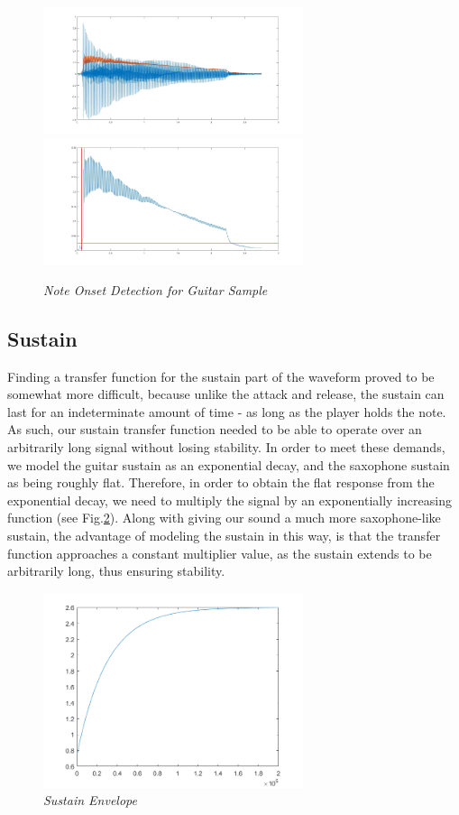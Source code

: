 \documentclass[twoside,a4paper]{article}
\begin{document}
\begin{figure}[ht]
  \includegraphics[width=3in]{Pictures/NoteDetect1.jpg}
  \includegraphics[width=3in]{Pictures/NoteDetect2.jpg}
  \caption{\label{Onset} {\it Note Onset Detection for Guitar Sample}}
  \centering
  \end{figure}

\subsection{Sustain}
Finding a transfer function for the sustain part of the waveform proved
to be somewhat more difficult, because unlike the attack and release,
the sustain can last for an indeterminate amount of time - as long as
the player holds the note. As such, our sustain transfer function needed
to be able to operate over an arbitrarily long signal without losing
stability. In order to meet these demands, we model the guitar sustain
as an exponential decay, and the saxophone sustain as being roughly flat.
Therefore, in order to obtain the flat response from the exponential decay,
we need to multiply the signal by an exponentially increasing function (see Fig.\ref{Sustain}).
Along with giving our sound a much more saxophone-like sustain, the advantage of
modeling the sustain in this way, is that the transfer function approaches a
constant multiplier value, as the sustain extends to be
arbitrarily long, thus ensuring stability.

\begin{figure}[ht]
  \includegraphics[width=3in]{Pictures/Sustain_Env.png}
  \centering
  \caption{\label{Sustain} {\it Sustain Envelope}}
  \centering
  \end{figure}
\end{document}
